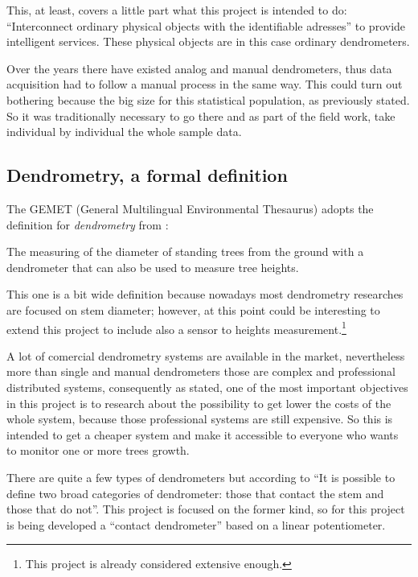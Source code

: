 \documentclass[11pt,a4paper,dvipsnames,twoside]{article}
\begin{document}
This, at least, covers a little part what this project is intended to do: \enquote{Interconnect ordinary physical objects with the identifiable adresses} to provide intelligent services. These physical objects are in this case ordinary dendrometers.

Over the years there have existed analog and manual dendrometers, thus data acquisition had to follow a manual process in the same way. This could turn out bothering because the big size for this statistical population, as previously stated. So it was traditionally necessary to go there and as part of the field work, take individual by individual the whole sample data.


\subsection{Dendrometry, a formal definition}
The GEMET (General Multilingual Environmental Thesaurus) adopts the definition for \textit{dendrometry} from \cite{DictNaturalRes}:

\begin{quoting}
  The measuring of the diameter of standing trees from the ground with a dendrometer that can also be used to measure tree heights.
\end{quoting}

This one is a bit wide definition because nowadays most dendrometry researches are focused on stem diameter; however, at this point could be interesting to extend this project to include also a sensor to heights measurement.\footnote{This project is already considered extensive enough.} 

A lot of comercial dendrometry systems are available in the market, nevertheless more than single and manual dendrometers those are complex and professional distributed systems, consequently as stated, one of the most important objectives in this project is to research about the possibility to get lower the costs of the whole system, because those professional systems are still expensive. So this is intended to get a cheaper system and make it accessible to everyone who wants to monitor one or more trees growth. 

There are quite a few types of dendrometers but according to \cite{DendroResearch} \enquote{It is possible to define two broad categories of dendrometer: those that contact the stem and those that do not}. This project is focused on the former kind, so for this project is being developed a \enquote{contact dendrometer} based on a linear potentiometer.
\end{document}
